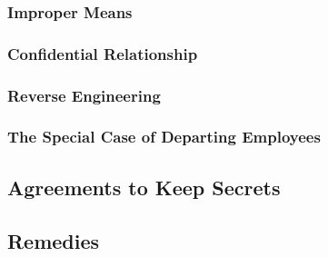 \subsubsection{Improper Means}


\subsubsection{Confidential Relationship}


\subsubsection{Reverse Engineering}


\subsubsection{The Special Case of Departing Employees}


\subsection{Agreements to Keep Secrets}


\subsection{Remedies}

